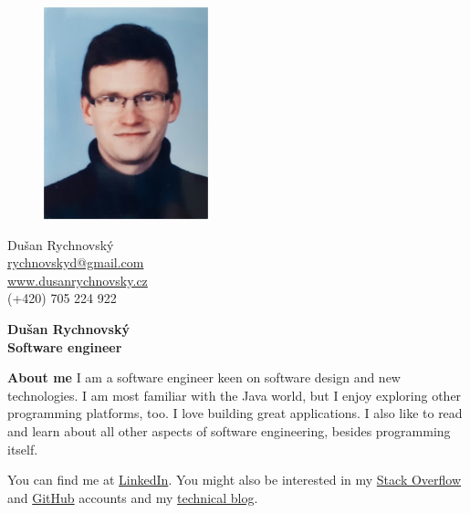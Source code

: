 \documentclass[a4paper,11pt,final]{memoir}
\newcommand{\Sep}{\vspace{1.4em}}
\newenvironment{AboutMe}
	{\ignorespaces\textbf{\color{RoyalBlue} About me}}
	{\Sep\ignorespacesafterend}
\begin{document}
\begin{figure}
	\hfill
	\includegraphics[width=0.7\columnwidth]{photo.jpg}
	\vspace{-7.5cm}
\end{figure}

\begin{flushright}\small
	Dušan Rychnovský \\
	\url{rychnovskyd@gmail.com}  \\
	\url{www.dusanrychnovsky.cz} \\
	(+420) 705 224 922
\end{flushright}\normalsize
\framebreak


\Huge\bfseries {\color{RoyalBlue} Dušan Rychnovský} \\
\Large\bfseries  Software engineer \\

\normalsize\normalfont

\begin{AboutMe}
I am a software engineer keen on software design and new technologies. I am most familiar with the Java world, but I enjoy exploring other programming platforms, too. I love building great applications. I also like to read and learn about all other aspects of software engineering, besides programming itself.

\medskip
You can find me at 
\href{http://cz.linkedin.com/pub/du%C5%A1an-rychnovsk%C3%BD/96/a42/a0/}{LinkedIn}.
You might also be interested in my
\href{http://stackoverflow.com/users/1103412/dusan-rychnovsky}{Stack Overflow} and
\href{https://github.com/dusan-rychnovsky}{GitHub} accounts and my
\href{http://blog.dusanrychnovsky.cz}{technical blog}.
\end{AboutMe}
\end{document}
